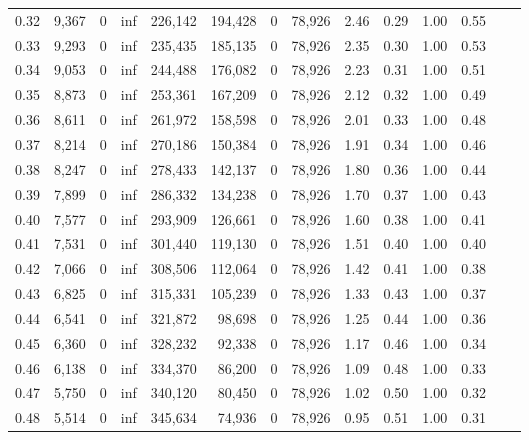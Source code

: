 \begin{tabular}{rrrrrrrrrrrrrr}
0.32 &  9,367 &      0 &      inf &  226,142 &  194,428 &       0 &  78,926 &  2.46 &  0.29 &  1.00 &      0.55 \\
0.33 &  9,293 &      0 &      inf &  235,435 &  185,135 &       0 &  78,926 &  2.35 &  0.30 &  1.00 &      0.53 \\
0.34 &  9,053 &      0 &      inf &  244,488 &  176,082 &       0 &  78,926 &  2.23 &  0.31 &  1.00 &      0.51 \\
0.35 &  8,873 &      0 &      inf &  253,361 &  167,209 &       0 &  78,926 &  2.12 &  0.32 &  1.00 &      0.49 \\
0.36 &  8,611 &      0 &      inf &  261,972 &  158,598 &       0 &  78,926 &  2.01 &  0.33 &  1.00 &      0.48 \\
0.37 &  8,214 &      0 &      inf &  270,186 &  150,384 &       0 &  78,926 &  1.91 &  0.34 &  1.00 &      0.46 \\
0.38 &  8,247 &      0 &      inf &  278,433 &  142,137 &       0 &  78,926 &  1.80 &  0.36 &  1.00 &      0.44 \\
0.39 &  7,899 &      0 &      inf &  286,332 &  134,238 &       0 &  78,926 &  1.70 &  0.37 &  1.00 &      0.43 \\
0.40 &  7,577 &      0 &      inf &  293,909 &  126,661 &       0 &  78,926 &  1.60 &  0.38 &  1.00 &      0.41 \\
0.41 &  7,531 &      0 &      inf &  301,440 &  119,130 &       0 &  78,926 &  1.51 &  0.40 &  1.00 &      0.40 \\
0.42 &  7,066 &      0 &      inf &  308,506 &  112,064 &       0 &  78,926 &  1.42 &  0.41 &  1.00 &      0.38 \\
0.43 &  6,825 &      0 &      inf &  315,331 &  105,239 &       0 &  78,926 &  1.33 &  0.43 &  1.00 &      0.37 \\
0.44 &  6,541 &      0 &      inf &  321,872 &   98,698 &       0 &  78,926 &  1.25 &  0.44 &  1.00 &      0.36 \\
0.45 &  6,360 &      0 &      inf &  328,232 &   92,338 &       0 &  78,926 &  1.17 &  0.46 &  1.00 &      0.34 \\
0.46 &  6,138 &      0 &      inf &  334,370 &   86,200 &       0 &  78,926 &  1.09 &  0.48 &  1.00 &      0.33 \\
0.47 &  5,750 &      0 &      inf &  340,120 &   80,450 &       0 &  78,926 &  1.02 &  0.50 &  1.00 &      0.32 \\
0.48 &  5,514 &      0 &      inf &  345,634 &   74,936 &       0 &  78,926 &  0.95 &  0.51 &  1.00 &      0.31 \\

\end{tabular}
